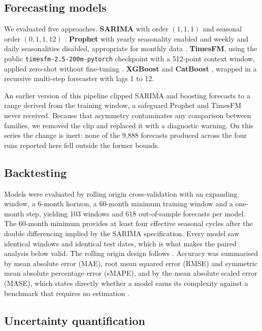 \subsection{Forecasting models}

We evaluated five approaches. \textbf{SARIMA} with order $(1,1,1)$ and seasonal order
$(0,1,1,12)$ \citep{box2015}. \textbf{Prophet} with yearly seasonality enabled and weekly
and daily seasonalities disabled, appropriate for monthly data \citep{taylor2018}.
\textbf{TimesFM}, using the public \texttt{timesfm-2.5-200m-pytorch} checkpoint with a
512-point context window, applied zero-shot without fine-tuning \citep{das2024}.
\textbf{XGBoost} \citep{chen2016} and \textbf{CatBoost} \citep{prokhorenkova2018}, wrapped
in a recursive multi-step forecaster with lags 1 to 12.

An earlier version of this pipeline clipped SARIMA and boosting forecasts to a range
derived from the training window, a safeguard Prophet and TimesFM never received. Because
that asymmetry contaminates any comparison between families, we removed the clip and
replaced it with a diagnostic warning. On this series the change is inert: none of the
9{,}888 forecasts produced across the four runs reported here fell outside the former
bounds.

\subsection{Backtesting}

Models were evaluated by rolling origin cross-validation with an expanding window, a
6-month horizon, a 60-month minimum training window and a one-month step, yielding 103
windows and 618 out-of-sample forecasts per model. The 60-month minimum provides at least
four effective seasonal cycles after the double differencing implied by the SARIMA
specification. Every model saw identical windows and identical test dates, which is what
makes the paired analysis below valid. The rolling origin design follows
\citet{tashman2000}. Accuracy was summarised by mean absolute error (MAE), root mean
squared error (RMSE) and symmetric mean absolute percentage error (sMAPE), and by the mean
absolute scaled error (MASE), which states directly whether a model earns its complexity
against a benchmark that requires no estimation \citep{hyndman2006}.

\subsection{Uncertainty quantification}

